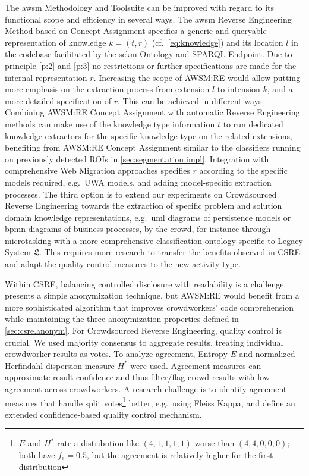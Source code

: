 The \gls{awsm} Methodology and Toolsuite can be improved with regard to its functional scope and efficiency in several ways.
The \gls{awsm} Reverse Engineering Method based on \gls{Concept Assignment} specifies a generic and queryable representation of knowledge \(k=(t,r)\) (cf.~\cref{eq:knowledge}) and its location \(l\) in the codebase facilitated by the \gls{sckm} Ontology and SPARQL Endpoint.
Due to principle \cref{p:2} and \cref{p:3} no restrictions or further specifications are made for the internal representation \(r\).
Increasing the scope of AWSM:RE would allow putting more emphasis on the extraction process from extension \(l\) to intension \(k\), and a more detailed specification of \(r\).
This can be achieved in different ways: Combining AWSM:RE \gls{Concept Assignment} with automatic \gls{Reverse Engineering} methods can make use of the knowledge type information \(t\) to run dedicated knowledge extractors for the specific knowledge type on the related extensions, benefiting from AWSM:RE \gls{Concept Assignment} similar to the classifiers running on previously detected ROIs in \cref{sec:segmentation.impl}.
Integration with comprehensive \gls{Web Migration} approaches specifies \(r\) according to the specific models required, e.g.~UWA models, and adding model-specific extraction processes.
The third option is to extend our experiments on Crowdsourced \gls{Reverse Engineering} towards the extraction of specific problem and solution domain knowledge representations, e.g.~\gls{uml} diagrams of persistence models or \gls{bpmn} diagrams of business processes, by the crowd, for instance through microtasking with a more comprehensive classification ontology specific to \gls{Legacy System} \(\mathfrak{L}\).
This requires more research to transfer the benefits observed in CSRE and adapt the quality control measures to the new activity type.

Within CSRE, balancing controlled disclosure with readability is a challenge.
 presents a simple anonymization technique, but AWSM:RE would benefit from a more sophisticated algorithm that improves crowdworkers' code comprehension while maintaining the three anonymization properties defined in \cref{sec:csre.anonym}.
For Crowdsourced \gls{Reverse Engineering}, quality control is crucial.
We used majority consensus to aggregate results, treating individual crowdworker results as votes.
To analyze agreement, Entropy \(E\) and normalized Herfindahl dispersion measure \(H^*\) were used.
Agreement measures can approximate result confidence and thus filter/flag crowd results with low agreement across crowdworkers.
A research challenge is to identify agreement measures that handle split votes\footnote{\(E\) and \(H^*\) rate a distribution like \((4,1,1,1,1)\) worse than \((4,4,0,0,0)\); both have \(f_e = 0.5\), but the agreement is relatively higher for the first distribution} better, e.g.~using Fleiss Kappa, and define an extended confidence-based quality control mechanism.

